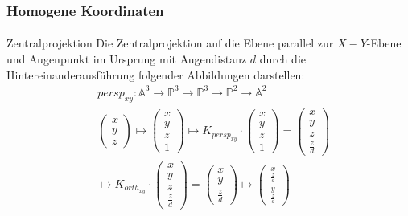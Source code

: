 \documentclass{beamer}
\begin{document}
\begin{frame}
    \frametitle{Homogene Koordinaten}
\framesubtitle{}
\begin{block}{Zentralprojektion}
Die Zentralprojektion auf die Ebene parallel zur $X-Y$-Ebene und Augenpunkt im Ursprung mit Augendistanz $d$ durch die Hintereinanderausführung folgender Abbildungen darstellen:
\begin{align*}
& persp_{xy} :\mathbb{A}^3   \to \mathbb{P}^3    \to  \mathbb{P}^3    \to \mathbb{P}^2    \to \mathbb{A}^2  \\
&\begin{pmatrix} x \\ y \\ z \end{pmatrix} \mapsto \begin{pmatrix} x \\ y \\ z \\ 1 \end{pmatrix}   \mapsto K_{persp_{xy}} \cdot  \begin{pmatrix} x \\ y \\ z \\ 1 \end{pmatrix} =   \begin{pmatrix} x \\ y \\ z \\ \frac{z}{d}  \end{pmatrix} \\
 & \mapsto K_{orth_{xy}} \cdot   \begin{pmatrix} x \\ y \\ z \\ \frac{z}{d}  \end{pmatrix}=   \begin{pmatrix} x \\ y \\ \frac{z}{d} \end{pmatrix}   \mapsto 
 \begin{pmatrix}  \frac{x}{\frac{z}{d} } \\   \frac{y}{\frac{z}{d} } \end{pmatrix}
 \end{align*}

\end{block}
\end{frame}
\end{document}

